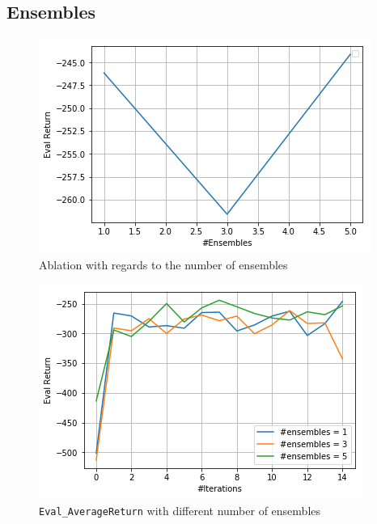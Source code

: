 \documentclass[11pt]{article}
\begin{document}
\subsection{Ensembles}
\label{sec:orga8f8e7d}
\begin{figure}[htbp]
\centering
\includegraphics[width=.9\linewidth]{./ensembles.png}
\caption{Ablation with regards to the number of ensembles}
\end{figure}


\begin{figure}[htbp]
\centering
\includegraphics[width=.9\linewidth]{./ensembles_eval.png}
\caption{\texttt{Eval\_AverageReturn} with different number of ensembles}
\end{figure}

\clearpage
\end{document}
